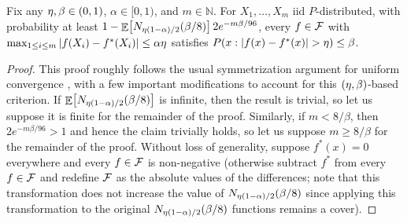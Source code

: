 \documentclass[12pt,a4paper,oneside,onecolumn]{book}
\begin{document}
\begin{theorem}
\label{thm:weak-learning-bound}
Fix any $\eta,\beta \in (0,1)$, $\alpha \in [0,1)$, and $m \in \mathbb{N}$. 
For $X_{1},\ldots,X_{m}$ iid $P$-distributed, 
with probability at least $1 - \mathop{\mathbb{E}}\!\left[ N_{\eta (1-\alpha)/2}(\beta/8) \right] 2 e^{-m \beta / 96}$, 
every $f \in \mathcal{F}$ with $\max_{1 \leq i \leq m} |f(X_{i}) - f^{*}(X_{i})| \leq \alpha \eta$ 
satisfies $P( x : | f(x) - f^{*}(x) | > \eta ) \leq \beta$.
\end{theorem}
\begin{proof} 
This proof roughly follows the usual symmetrization argument for uniform convergence \citep{MR0288823,DBLP:journals/iandc/Haussler92}, 
with a few important modifications to account for this $(\eta,\beta)$-based criterion. 
If $\mathop{\mathbb{E}}\!\left[ N_{\eta (1-\alpha)/2}(\beta/8) \right]$ is infinite, then the result is trivial, so let us suppose it is finite for the remainder of the proof.
Similarly, if $m < 8/\beta$, then $2 e^{-m \beta/96} > 1$ and hence the claim trivially holds, so let us suppose $m \geq 8/\beta$ for the remainder of the proof.
Without loss of generality, suppose $f^{*}(x) = 0$ everywhere and every $f \in \mathcal{F}$ is non-negative 
(otherwise subtract $f^{*}$ from every $f \in \mathcal{F}$ and redefine $\mathcal{F}$ as the absolute values of the differences; 
note that this transformation does not increase the value of $N_{\eta (1-\alpha)/2}(\beta/8)$ since applying this 
transformation to the original $N_{\eta (1-\alpha)/2}(\beta/8)$ functions remains a cover).


\end{proof}
\end{document}
